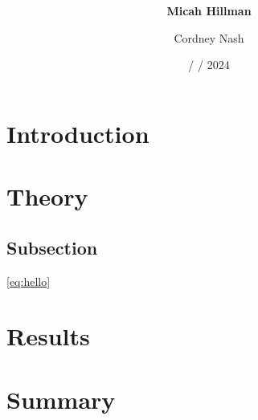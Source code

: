 \documentclass[a4paper,12pt,english]{all-in-one} %
\title{{\large\textit{}}\\[0.5cm]{\Huge\color{gray}\textsc{\@docsubtitle}}}
\author{\textbf{Micah Hillman}  \and Cordney Nash  }
\date{/ / 2024}
\begin{document}
\begin{titlepage}
\maketitle\vfill
\end{titlepage}
\newpage


\section*{Introduction}
\lipsum[1]


\begin{multicols}{2}

\section*{Theory}

    \subsection*{Subsection}
    \lipsum[4-8] \eqref{eq:hello}
    
\section*{Results}
    \lipsum[10-13]

\end{multicols}

\section*{Summary}
        \lipsum[14]
        \lipsum[15]
\end{document}
